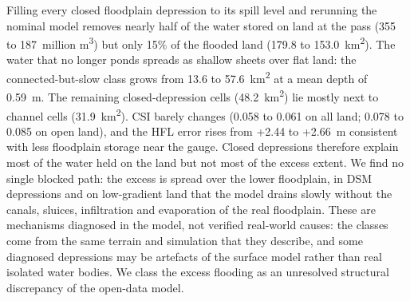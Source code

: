 \documentclass[preprint,12pt,authoryear]{elsarticle}
\newcommand{\kmsq}{km\textsuperscript{2}}
\newcommand{\Mcm}{million m\textsuperscript{3}}
\begin{document}
Filling every closed floodplain depression to its spill level and rerunning the nominal model removes nearly half of the water stored on land at the pass (355 to 187~\Mcm) but only 15\% of the flooded land (179.8 to 153.0~\kmsq). The water that no longer ponds spreads as shallow sheets over flat land: the connected-but-slow class grows from 13.6 to 57.6~\kmsq{} at a mean depth of 0.59~m. The remaining closed-depression cells (48.2~\kmsq) lie mostly next to channel cells (31.9~\kmsq). CSI barely changes (0.058 to 0.061 on all land; 0.078 to 0.085 on open land), and the HFL error rises from +2.44 to +2.66~m consistent with less floodplain storage near the gauge. Closed depressions therefore explain most of the water held on the land but not most of the excess extent. We find no single blocked path: the excess is spread over the lower floodplain, in DSM depressions and on low-gradient land that the model drains slowly without the canals, sluices, infiltration and evaporation of the real floodplain. These are mechanisms diagnosed in the model, not verified real-world causes: the classes come from the same terrain and simulation that they describe, and some diagnosed depressions may be artefacts of the surface model rather than real isolated water bodies. We class the excess flooding as an unresolved structural discrepancy of the open-data model.
\end{document}
